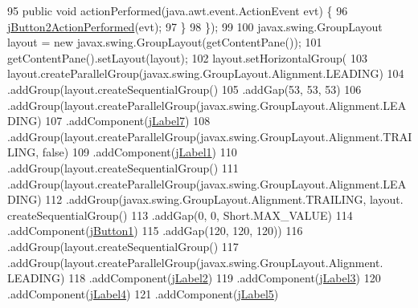 \begin{DoxyCode}
95             \textcolor{keyword}{public} \textcolor{keywordtype}{void} actionPerformed(java.awt.event.ActionEvent evt) \{
96                 \mbox{\hyperlink{class_interfaz_package_1_1_alta_libro_lectura_a2e75097b1dde02511d6f9209ee624e73}{jButton2ActionPerformed}}(evt);
97             \}
98         \});
99 
100         javax.swing.GroupLayout layout = \textcolor{keyword}{new} javax.swing.GroupLayout(getContentPane());
101         getContentPane().setLayout(layout);
102         layout.setHorizontalGroup(
103             layout.createParallelGroup(javax.swing.GroupLayout.Alignment.LEADING)
104             .addGroup(layout.createSequentialGroup()
105                 .addGap(53, 53, 53)
106                 .addGroup(layout.createParallelGroup(javax.swing.GroupLayout.Alignment.LEADING)
107                     .addComponent(\mbox{\hyperlink{class_interfaz_package_1_1_alta_libro_lectura_a35314814f07024c5ef5f0afa592a502f}{jLabel7}})
108                     .addGroup(layout.createParallelGroup(javax.swing.GroupLayout.Alignment.TRAILING, \textcolor{keyword}{false})
109                         .addComponent(\mbox{\hyperlink{class_interfaz_package_1_1_alta_libro_lectura_a356654b6ac16de88f1537402ce6b6258}{jLabel1}})
110                         .addGroup(layout.createSequentialGroup()
111                             .addGroup(layout.createParallelGroup(javax.swing.GroupLayout.Alignment.LEADING)
112                                 .addGroup(javax.swing.GroupLayout.Alignment.TRAILING, layout.
      createSequentialGroup()
113                                     .addGap(0, 0, Short.MAX\_VALUE)
114                                     .addComponent(\mbox{\hyperlink{class_interfaz_package_1_1_alta_libro_lectura_abd046e1ca910f6419304b648e1e0ecaa}{jButton1}})
115                                     .addGap(120, 120, 120))
116                                 .addGroup(layout.createSequentialGroup()
117                                     .addGroup(layout.createParallelGroup(javax.swing.GroupLayout.Alignment.
      LEADING)
118                                         .addComponent(\mbox{\hyperlink{class_interfaz_package_1_1_alta_libro_lectura_adbfcbf3815dc0b6a49f8f73bfb381191}{jLabel2}})
119                                         .addComponent(\mbox{\hyperlink{class_interfaz_package_1_1_alta_libro_lectura_a8e3068311cd0998f45b8d16b5df07315}{jLabel3}})
120                                         .addComponent(\mbox{\hyperlink{class_interfaz_package_1_1_alta_libro_lectura_a0f93dcf00bc93a61d9fc78c0143d9bdf}{jLabel4}})
121                                         .addComponent(\mbox{\hyperlink{class_interfaz_package_1_1_alta_libro_lectura_a022dc8ebc55257499f93b99bddf47167}{jLabel5}})

\end{DoxyCode}
